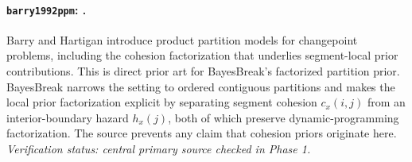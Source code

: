 
\paragraph{\texttt{barry1992ppm}: \citet{barry1992ppm}.}
Barry and Hartigan introduce product partition models for changepoint problems, including the cohesion factorization that underlies segment-local prior contributions. This is direct prior art for BayesBreak's factorized partition prior. BayesBreak narrows the setting to ordered contiguous partitions and makes the local prior factorization explicit by separating segment cohesion $c_x(i,j)$ from an interior-boundary hazard $h_x(j)$, both of which preserve dynamic-programming factorization. The source prevents any claim that cohesion priors originate here. \textit{Verification status: central primary source checked in Phase 1.}
